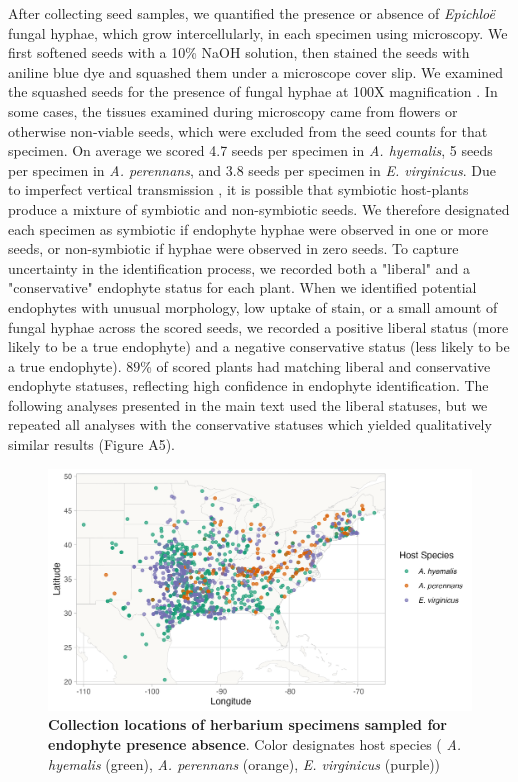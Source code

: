 \documentclass[11pt]{article}
\let\cite\citep
\begin{document}
After collecting seed samples, we quantified the presence or absence of \emph{Epichloë} fungal hyphae, which grow intercellularly, in each specimen using microscopy. 
We first softened seeds with a 10\% NaOH solution, then stained the seeds with aniline blue dye and squashed them under a microscope cover slip. 
We examined the squashed seeds for the presence of fungal hyphae at 100X magnification \cite{bacon2018stains}.
In some cases, the tissues examined during microscopy came from flowers or otherwise non-viable seeds, which were excluded from the seed counts for that specimen.
On average we scored 4.7 seeds per specimen in \emph{A. hyemalis}, 5 seeds per specimen in \emph{A. perennans}, and 3.8 seeds per specimen in \emph{E. virginicus}.
Due to imperfect vertical transmission \cite{afkhami2008symbiosis}, it is possible that symbiotic host-plants produce a mixture of symbiotic and non-symbiotic seeds. 
We therefore designated each specimen as symbiotic if endophyte hyphae were observed in one or more seeds, or non-symbiotic if hyphae were observed in zero seeds. 
To capture uncertainty in the identification process, we recorded both a "liberal" and a "conservative" endophyte status for each plant.  
When we identified potential endophytes with unusual morphology, low uptake of stain, or a small amount of fungal hyphae across the scored seeds, we recorded a positive liberal status (more likely to be a true endophyte) and a negative conservative status (less likely to be a true endophyte). 
$89$\% of scored plants had matching liberal and conservative endophyte statuses, reflecting high confidence in endophyte identification.
The following analyses presented in the main text used the liberal statuses, but we repeated all analyses with the conservative statuses which yielded qualitatively similar results (Figure A5). 

\begin{figure}[H]
	\centering
	\includegraphics[width = \linewidth]{collections_map.png}
	\caption{\textbf{Collection locations of herbarium specimens sampled for endophyte presence absence}. Color designates host species ( \emph{A. hyemalis} (green), \emph{A. perennans} (orange), \emph{E. virginicus} (purple))}
\end{figure}
\end{document}
